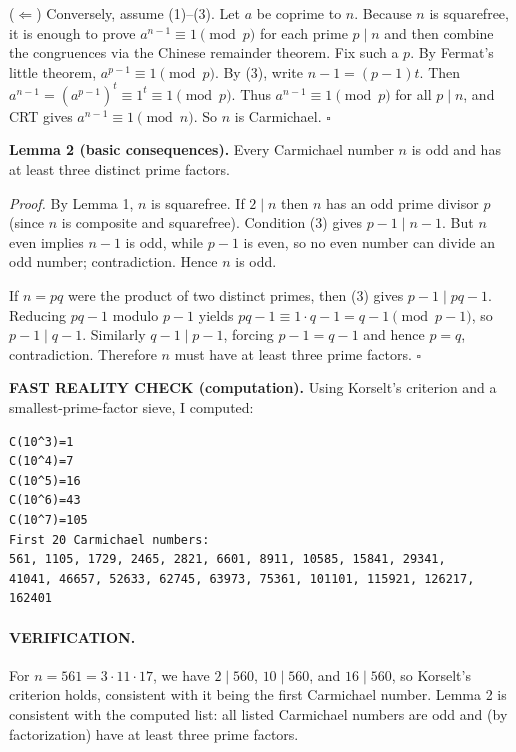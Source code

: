 ($\Leftarrow$) Conversely, assume (1)--(3).
Let $a$ be coprime to $n$.
Because $n$ is squarefree, it is enough to prove $a^{n-1}\equiv 1\pmod p$ for each prime $p\mid n$ and then combine the congruences via the Chinese remainder theorem.
Fix such a $p$. By Fermat's little theorem, $a^{p-1}\equiv 1\pmod p$.
By (3), write $n-1=(p-1)t$.
Then $a^{n-1}=(a^{p-1})^t\equiv 1^t\equiv 1\pmod p$.
Thus $a^{n-1}\equiv 1\pmod p$ for all $p\mid n$, and CRT gives $a^{n-1}\equiv 1\pmod n$.
So $n$ is Carmichael.
\hfill$\square$

\textbf{Lemma 2 (basic consequences).}
Every Carmichael number $n$ is odd and has at least three distinct prime factors.

\emph{Proof.}
By Lemma 1, $n$ is squarefree.
If $2\mid n$ then $n$ has an odd prime divisor $p$ (since $n$ is composite and squarefree).
Condition (3) gives $p-1\mid n-1$.
But $n$ even implies $n-1$ is odd, while $p-1$ is even, so no even number can divide an odd number; contradiction.
Hence $n$ is odd.

If $n=pq$ were the product of two distinct primes, then (3) gives $p-1\mid pq-1$.
Reducing $pq-1$ modulo $p-1$ yields $pq-1\equiv 1\cdot q-1=q-1\pmod{p-1}$, so $p-1\mid q-1$.
Similarly $q-1\mid p-1$, forcing $p-1=q-1$ and hence $p=q$, contradiction.
Therefore $n$ must have at least three prime factors.
\hfill$\square$

\textbf{FAST REALITY CHECK (computation).}
Using Korselt's criterion and a smallest-prime-factor sieve, I computed:
\begin{verbatim}
C(10^3)=1
C(10^4)=7
C(10^5)=16
C(10^6)=43
C(10^7)=105
First 20 Carmichael numbers:
561, 1105, 1729, 2465, 2821, 6601, 8911, 10585, 15841, 29341,
41041, 46657, 52633, 62745, 63973, 75361, 101101, 115921, 126217, 162401
\end{verbatim}

\paragraph{VERIFICATION.}
For $n=561=3\cdot 11\cdot 17$, we have $2\mid 560$, $10\mid 560$, and $16\mid 560$, so Korselt's criterion holds, consistent with it being the first Carmichael number.
Lemma 2 is consistent with the computed list: all listed Carmichael numbers are odd and (by factorization) have at least three prime factors.

